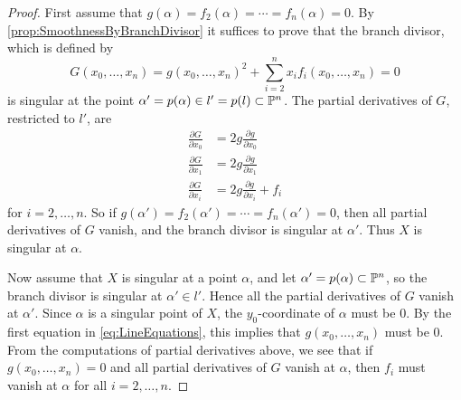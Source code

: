\begin{proof}
First assume that $g(\alpha)=f_2(\alpha)=\cdots = f_n(\alpha) = 0$. By \cref{prop:SmoothnessByBranchDivisor} it suffices to prove that the branch divisor, which is defined by
\[G(x_0,\dots,x_n) = g(x_0,\dots,x_n)^2 + \sum_{i=2}^nx_if_i(x_0,\dots,x_n)=0 \]
is singular at the point $\alpha' = p(\alpha) \in l' = p(l) \subset \P^n$. The partial derivatives of $G$, restricted to $l'$, are 
\begin{align*}
  \frac{\partial G}{\partial x_0} &= 2g\frac{\partial g}{\partial x_0}\\
  \frac{\partial G}{\partial x_1} &= 2g\frac{\partial g}{\partial x_1}\\
  \frac{\partial G}{\partial x_i} &= 2g\frac{\partial g}{\partial x_i} + f_i
\end{align*}
for $i=2,\dots,n$. So if $g(\alpha')=f_2(\alpha')=\cdots = f_n(\alpha') = 0$, then all partial derivatives of $G$ vanish, and the branch divisor is singular at $\alpha'$. Thus $X$ is singular at $\alpha$.

Now assume that $X$ is singular at a point $\alpha$, and let $\alpha' = p(\alpha) \subset \P^n$, so the branch divisor is singular at $\alpha' \in l'$. Hence all the partial derivatives of $G$ vanish at $\alpha'$. Since $\alpha$ is a singular point of $X$, the $y_0$-coordinate of $\alpha$ must be 0. By the first equation in \eqref{eq:LineEquations}, this implies that $g(x_0,\dots,x_n)$ must be 0. From the computations of partial derivatives above, we see that if $g(x_0,\dots,x_n) = 0$ and all partial derivatives of $G$ vanish at $\alpha$, then $f_i$ must vanish at $\alpha$ for all $i = 2,\dots,n$.
\end{proof}
 
